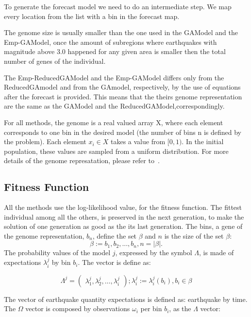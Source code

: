 To generate the forecast model we need to do an intermediate step. We
map every location from the list with a bin in the forecast map.

The genome size is usually smaller than the one used in the GAModel
and the Emp-GAModel, once the amount of subregions where earthquakes
with magnitude above 3.0 happened for any given area is smaller then
the total number of genes of the individual.

The Emp-ReducedGAModel and the Emp-GAModel differs only from the
ReducedGAmodel and from the GAmodel, respectively, by the use of
equations after the forecast is provided. This means that the theirs
genome representation are the same as the GAModel and the
ReducedGAModel,correspondingly.

For all methods, the genome is a real valued array X, where each
element corresponds to one bin in the desired model (the number of
bins n is defined by the problem). Each element $x_i \in X$ takes a
value from $[0,1)$. In the initial population, these values are
sampled from a uniform distribution. For more details of the genome
represatation, please refer to~\cite{ecta14}.

\subsection{Fitness Function}
All the methods use the log-likelihood value, for the fitness
function. The fittest individual among all the others, is preserved in
the next generation, to make the solution of one generation as good as
the its last generation.  The bins, a gene of the genome
representation, $b_n$, define the set $\beta$ and $n$ is the size of
the set $\beta$:
\begin{equation} 
\beta := {b_1,b_2,...,b_n},n = |\beta|.
\end{equation}
The probability values of the model $j$, expressed by the symbol
$\Lambda$, is made of expectations $\lambda_i^j$ by bin $b_i$. The
vector is define as:
				
\begin{equation}
	\Lambda^j = 
\begin{pmatrix}
    \lambda_1^j, 
    \lambda_2^j, 
    \hdots,
    \lambda_i^j
  \end{pmatrix}
  ;\lambda_i^j := \lambda_i^j(b_i),b_i \in \beta
\end{equation}
		
The vector of earthquake quantity expectations is defined as:
earthquake by time. The $\Omega$ vector is composed by observations
$\omega_i$ per bin $b_i$, as the $\Lambda$ vector:

